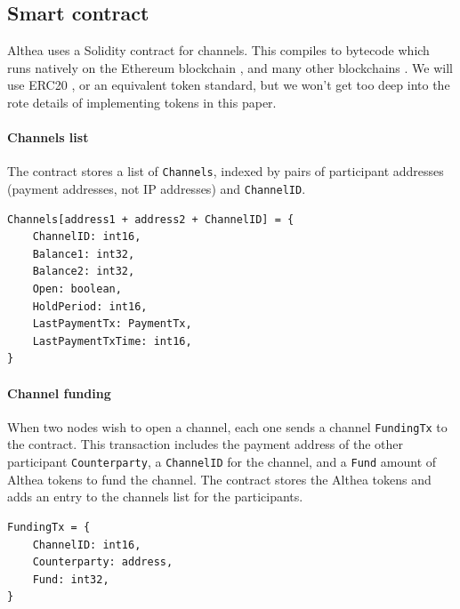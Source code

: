 \documentclass[11pt]{article}
\newlength{\currentparskip}
\newenvironment{unbreakable}
  {\setlength{\currentparskip}{\parskip}%
	 \vspace{\currentparskip}
   \begin{minipage}{\textwidth}%
   \setlength{\parskip}{\currentparskip}%
  }
  {\end{minipage}\vspace{\currentparskip}}
\begin{document}
\subsection{Smart contract}
Althea uses a Solidity contract for channels. This compiles to bytecode which runs natively on the Ethereum blockchain \cite{ethereum}, and many other blockchains \cite{ethermint}. We will use ERC20 \cite{erc20}, or an equivalent token standard, but we won’t get too deep into the rote details of implementing tokens in this paper.

\begin{unbreakable}
\paragraph{Channels list}
The contract stores a list of \texttt{Channels}, indexed by pairs of participant addresses (payment addresses, not IP addresses) and \texttt{ChannelID}.

\begin{lstlisting}
Channels[address1 + address2 + ChannelID] = {
	ChannelID: int16,
	Balance1: int32,
	Balance2: int32,
	Open: boolean,
	HoldPeriod: int16,
	LastPaymentTx: PaymentTx,
	LastPaymentTxTime: int16,
}
\end{lstlisting}
\end{unbreakable}

\begin{unbreakable}
\paragraph{Channel funding}
When two nodes wish to open a channel, each one sends a channel \texttt{FundingTx} to the contract. This transaction includes the payment address of the other participant \texttt{Counterparty}, a \texttt{ChannelID} for the channel, and a \texttt{Fund} amount of Althea tokens to fund the channel. The contract stores the Althea tokens and adds an entry to the channels list for the participants.

\begin{lstlisting}
FundingTx = {
	ChannelID: int16,
	Counterparty: address,
	Fund: int32,
}
\end{lstlisting}
\end{unbreakable}
\end{document}

